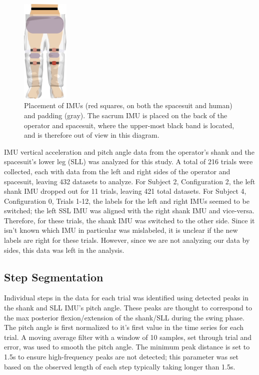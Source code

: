 \documentclass[defaultstyle,11pt]{comps}
\begin{document}
\begin{figure}
\hypertarget{fig:SA1-Loc}{%
\centering
\includegraphics[width=0.2\textwidth,height=\textheight]{../fig/SA1/IMUPlacement.png}
\caption{Placement of IMUs (red squares, on both the spacesuit and human) and padding (gray). The sacrum IMU is placed on the back of the operator and spacesuit, where the upper-most black band is located, and is therefore out of view in this diagram.}\label{fig:SA1-Loc}
}
\end{figure}

IMU vertical acceleration and pitch angle data from the operator's shank and the spacesuit's lower leg (SLL) was analyzed for this study.
A total of 216 trials were collected, each with data from the left and right sides of the operator and spacesuit, leaving 432 datasets to analyze.
For Subject 2, Configuration 2, the left shank IMU dropped out for 11 trials, leaving 421 total datasets.
For Subject 4, Configuration 0, Trials 1-12, the labels for the left and right IMUs seemed to be switched; the left SSL IMU was aligned with the right shank IMU and vice-versa.
Therefore, for these trials, the shank IMU was switched to the other side.
Since it isn't known which IMU in particular was mislabeled, it is unclear if the new labels are right for these trials.
However, since we are not analyzing our data by sides, this data was left in the analysis.

\hypertarget{step-segmentation}{%
\subsection{Step Segmentation}\label{step-segmentation}}

Individual steps in the data for each trial was identified using detected peaks in the shank and SLL IMU's pitch angle.
These peaks are thought to correspond to the max posterior flexion/extension of the shank/SLL during the swing phase.
The pitch angle is first normalized to it's first value in the time series for each trial.
A moving average filter with a window of 10 samples, set through trial and error, was used to smooth the pitch angle.
The minimum peak distance is set to 1.5s to ensure high-frequency peaks are not detected; this parameter was set based on the observed length of each step typically taking longer than 1.5s.
\end{document}
